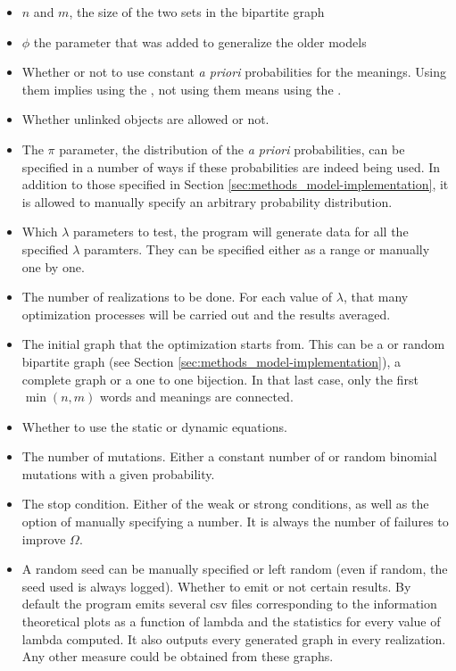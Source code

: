 \begin{itemize}
\item
  $n$ and $m$, the size of the two sets in the bipartite graph
\item
  $\phi$ the parameter that was added to generalize the older models
\item
  Whether or not to use constant \emph{a priori} probabilities for the meanings.
  Using them implies using the \secondmodel{}, not using them means using the \firstmodel{}.
\item
  Whether unlinked objects are allowed or not.
\item
  The $\pi$ parameter, the distribution of the \emph{a priori} probabilities, can be specified in a number of ways if these probabilities are indeed being used.
  In addition to those specified in Section \ref{sec:methods_model-implementation}, it is allowed to manually specify an arbitrary probability distribution.
\item
  Which $\lambda$ parameters to test, the program will generate data for all the specified $\lambda$ paramters.
 They can be specified either as a range or manually one by one.
\item
  The number of realizations to be done.
  For each value of $\lambda$, that many optimization processes will be carried out and the results averaged.
\item
  The initial graph that the optimization starts from.
  This can be a  or  random bipartite graph (see Section \ref{sec:methods_model-implementation}), a complete graph or a one to one bijection.
  In that last case, only the first $\min(n,m)$ words and meanings are connected.
\item
  Whether to use the static or dynamic equations.
\item
  The number of mutations.
  Either a constant number of or random binomial mutations with a given probability.
\item
  The stop condition.
  Either of the weak or strong conditions, as well as the option of manually specifying a number.
  It is always the number of failures to improve $\Omega$.
\item
  A random seed can be manually specified or left random (even if random, the seed used is always logged).
  Whether to emit or not certain results.
  By default the program emits several csv files corresponding to the information theoretical plots as a function of lambda and the statistics for every value of lambda computed.
  It also outputs every generated graph in every realization.
  Any other measure could be obtained from these graphs.
\end{itemize}

